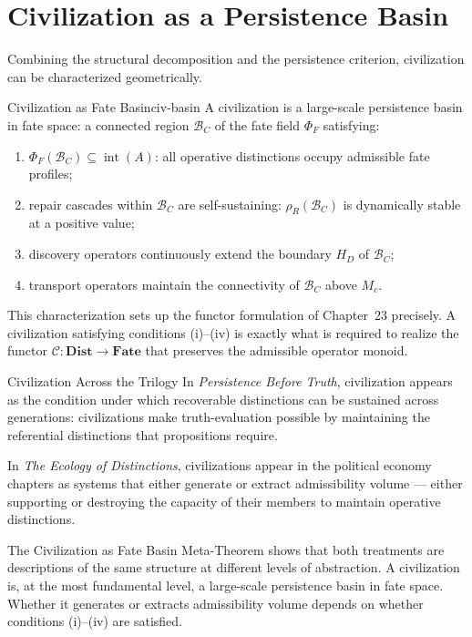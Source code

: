\documentclass[12pt,twoside,openright]{book}
\newcommand{\admRegion}{A}
\newcommand{\catDist}{\mathbf{Dist}}
\newcommand{\catFate}{\mathbf{Fate}}
\newcommand{\civFunc}{\mathcal{C}}
\providecommand{\admRegion}{A}
\providecommand{\fateField}{\Phi_{F}}
\providecommand{\repairDens}[1]{\rho_{R}(#1)}
\providecommand{\discHorizon}{H_{D}}
\providecommand{\critThresh}{M_{c}}
\providecommand{\catDist}{\mathbf{Dist}}
\providecommand{\catFate}{\mathbf{Fate}}
\providecommand{\civFunc}{\mathcal{C}}
\begin{document}
\section{Civilization as a Persistence Basin}

Combining the structural decomposition and the persistence
criterion, civilization can be characterized geometrically.

\begin{metatheorem}{Civilization as Fate Basin}{civ-basin}
A civilization is a large-scale persistence basin in fate
space: a connected region $\mathcal{B}_C$ of the fate field
$\fateField$ satisfying:
\begin{enumerate}[nosep,label=(\roman*)]
  \item $\fateField(\mathcal{B}_C)\subseteq\operatorname{int}(\admRegion)$:
    all operative distinctions occupy admissible fate profiles;
  \item repair cascades within $\mathcal{B}_C$ are
    self-sustaining: $\repairDens{\mathcal{B}_C}$ is
    dynamically stable at a positive value;
  \item discovery operators continuously extend the boundary
    $\discHorizon$ of $\mathcal{B}_C$;
  \item transport operators maintain the connectivity of
    $\mathcal{B}_C$ above $\critThresh$.
\end{enumerate}
\end{metatheorem}

This characterization sets up the functor formulation of
Chapter~23 precisely. A civilization satisfying conditions
(i)--(iv) is exactly what is required to realize the functor
$\civFunc:\catDist\to\catFate$ that preserves the admissible
operator monoid.

\begin{trilogylink}{Civilization Across the Trilogy}
In \textit{Persistence Before Truth}, civilization appears
as the condition under which recoverable distinctions can be
sustained across generations: civilizations make truth-evaluation
possible by maintaining the referential distinctions that
propositions require.

In \textit{The Ecology of Distinctions}, civilizations appear
in the political economy chapters as systems that either
generate or extract admissibility volume --- either supporting
or destroying the capacity of their members to maintain
operative distinctions.

The Civilization as Fate Basin Meta-Theorem shows that both
treatments are descriptions of the same structure at different
levels of abstraction. A civilization is, at the most
fundamental level, a large-scale persistence basin in fate
space. Whether it generates or extracts admissibility volume
depends on whether conditions (i)--(iv) are satisfied.
\end{trilogylink}
\end{document}
